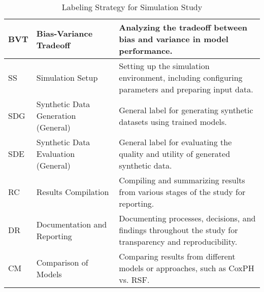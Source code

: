 \begin{table}[h!]
\begin{tabular}{|l|l|p{10cm}|}
    BVT  & Bias-Variance Tradeoff       & Analyzing the tradeoff between bias and variance in model performance. \\ \hline
    SS   & Simulation Setup             & Setting up the simulation environment, including configuring parameters and preparing input data. \\ \hline
    SDG  & Synthetic Data Generation (General) & General label for generating synthetic datasets using trained models. \\ \hline
    SDE  & Synthetic Data Evaluation (General) & General label for evaluating the quality and utility of generated synthetic data. \\ \hline
    RC   & Results Compilation          & Compiling and summarizing results from various stages of the study for reporting. \\ \hline
    DR   & Documentation and Reporting  & Documenting processes, decisions, and findings throughout the study for transparency and reproducibility. \\ \hline
    CM   & Comparison of Models         & Comparing results from different models or approaches, such as CoxPH vs. RSF. \\ \hline
    \end{tabular}
    \caption{Labeling Strategy for Simulation Study}
    \label{tab:labeling_strategy}
    \end{table}